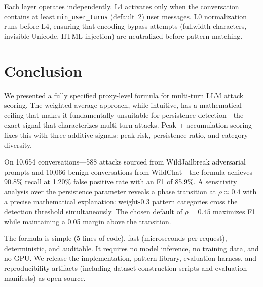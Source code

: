 \documentclass[11pt,a4paper]{article}
\begin{document}
Each layer operates independently. L4 activates only when the
conversation contains at least \texttt{min\_user\_turns} (default~2)
user messages. L0 normalization runs before L4, ensuring that encoding
bypass attempts (fullwidth characters, invisible Unicode, HTML injection)
are neutralized before pattern matching.

\section{Conclusion}
\label{sec:conclusion}

We presented a fully specified proxy-level formula for multi-turn LLM
attack scoring. The weighted average approach, while intuitive, has a
mathematical ceiling that makes it fundamentally unsuitable for
persistence detection---the exact signal that characterizes multi-turn
attacks. Peak + accumulation scoring fixes this with three additive
signals: peak risk, persistence ratio, and category diversity.

On 10,654 conversations---588 attacks sourced from WildJailbreak
adversarial prompts and 10,066 benign conversations from
WildChat---the formula achieves 90.8\% recall at 1.20\% false positive
rate with an F1 of 85.9\%. A sensitivity analysis over the persistence
parameter reveals a phase transition at $\rho \approx 0.4$ with a
precise mathematical explanation: weight-0.3 pattern categories cross
the detection threshold simultaneously. The chosen default of $\rho =
0.45$ maximizes F1 while maintaining a 0.05 margin above the
transition.

The formula is simple (5 lines of code), fast (microseconds per
request), deterministic, and auditable. It requires no model inference,
no training data, and no GPU. We release the implementation, pattern
library, evaluation harness, and reproducibility artifacts (including
dataset construction scripts and evaluation manifests) as open source.

\end{document}
